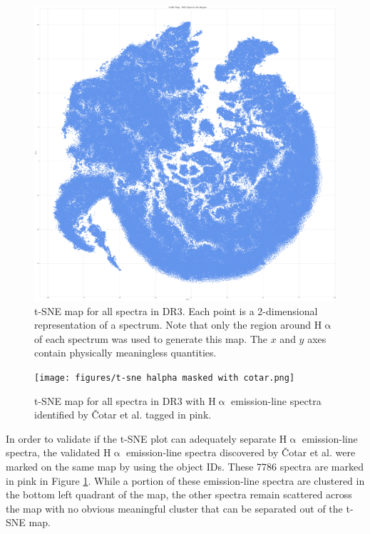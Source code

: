\begin{figure}[h]
\centering
\includegraphics[scale=0.12]{figures/t-sne halpha masked.png}
\caption{t-SNE map for all spectra in DR3. Each point is a 2-dimensional representation of a spectrum. Note that only the region around H$\upalpha$ of each spectrum was used to generate this map. The $x$ and $y$ axes contain physically meaningless quantities.}
\end{figure}

\begin{figure}[t]
\centering
\texttt{[image: figures/t-sne halpha masked with cotar.png]}
\caption{t-SNE map for all spectra in DR3 with H$\upalpha$ emission-line spectra identified by Čotar et al. tagged in pink.}
\label{fig5.3}
\end{figure}

In order to validate if the t-SNE plot can adequately separate H$\upalpha$ emission-line spectra, the validated H$\upalpha$ emission-line spectra discovered by Čotar et al.\cite{vcotar2021galah} were marked on the same map by using the object IDs. These 7786 spectra are marked in pink in Figure \ref{fig5.3}. While a portion of these emission-line spectra are clustered in the bottom left quadrant of the map, the other spectra remain scattered across the map with no obvious meaningful cluster that can be separated out of the t-SNE map. 

